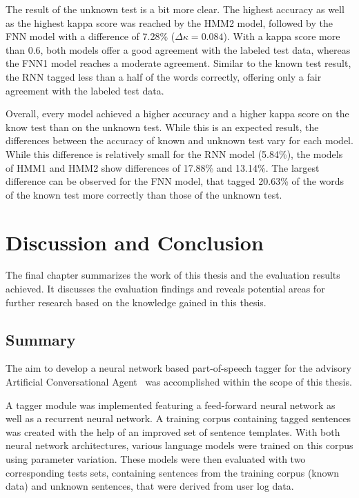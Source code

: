 The result of the unknown test is a bit more clear. The highest accuracy as well as the highest kappa score was reached by the HMM2 model, followed by the FNN model with a difference of 7.28\% ($\Delta\kappa=0.084$). With a kappa score more than 0.6, both models offer a good agreement with the labeled test data, whereas the FNN1 model reaches a moderate agreement. Similar to the known test result, the RNN tagged less than a half of the words correctly, offering only a fair agreement with the labeled test data.

Overall, every model achieved a higher accuracy and a higher kappa score on the know test than on the unknown test. While this is an expected result, the differences between the accuracy of known and unknown test vary for each model. While this difference is relatively small for the RNN model (5.84\%), the models of HMM1 and HMM2 show differences of 17.88\% and 13.14\%. The largest difference can be observed for the FNN model, that tagged 20.63\% of the words of the known test more correctly than those of the unknown test.

\chapter{Discussion and Conclusion}\label{c.conclusion}
The final chapter summarizes the work of this thesis and the evaluation results achieved. It discusses the evaluation findings and reveals potential areas for further research based on the knowledge gained in this thesis.

\section{Summary}\label{c.conclusion.summary}
The aim to develop a neural network based part-of-speech tagger for the advisory Artificial Conversational Agent \Alex\ was accomplished within the scope of this thesis.

A tagger module was implemented featuring a feed-forward neural network as well as a recurrent neural network. A training corpus containing tagged sentences was created with the help of an improved set of sentence templates. With both neural network architectures, various language models were trained on this corpus using parameter variation. These models were then evaluated with two corresponding tests sets, containing sentences from the training corpus (known data) and unknown sentences, that were derived from user log data.

